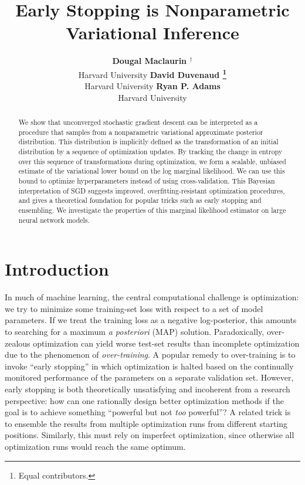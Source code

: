 \documentclass[]{article}
\title{Early Stopping is Nonparametric Variational Inference}
\author{ {\bf Dougal Maclaurin $^\dagger$} \\
Harvard University
\And
{\bf David Duvenaud \thanks{ \hspace{1em}Equal contributors.}}  \\
Harvard University
\And
{\bf Ryan P. Adams}   \\
Harvard University
}
\begin{document}
\maketitle

\begin{abstract}
We show that unconverged stochastic gradient descent 
can be interpreted as a procedure that samples from a nonparametric variational approximate posterior distribution.
This distribution is implicitly defined as the transformation of an initial distribution by a sequence of optimization updates. %
By tracking the change in entropy over this sequence of transformations during optimization, we form a scalable, unbiased estimate of the variational lower bound on the log marginal likelihood.
We can use this bound to optimize hyperparameters instead of using cross-validation.
This Bayesian interpretation of SGD suggests improved, overfitting-resistant optimization procedures, and gives a theoretical foundation for popular tricks such as early stopping and ensembling.
We investigate the properties of this marginal likelihood estimator on large neural network models.
\end{abstract}

\section{Introduction}

In much of machine learning, the central computational challenge is optimization: we try to minimize some training-set loss with respect to a set of model parameters.
If we treat the training loss as a negative log-posterior, this amounts to searching for a maximum \emph{a posteriori} (MAP) solution.
Paradoxically, over-zealous optimization can yield worse test-set results than incomplete optimization due to the phenomenon of \emph{over-training}.
A popular remedy to over-training is to invoke ``early stopping'' in which optimization is halted based on the continually monitored performance of the parameters on a separate validation set.
However, early stopping is both theoretically unsatisfying and incoherent from a research perspective: how can one rationally design better optimization methods if the goal is to achieve something ``powerful but not \emph{too} powerful''?
A related trick is to ensemble the results from multiple optimization runs from different starting positions.
Similarly, this must rely on imperfect optimization, since otherwise all optimization runs would reach the same optimum.
\end{document}
